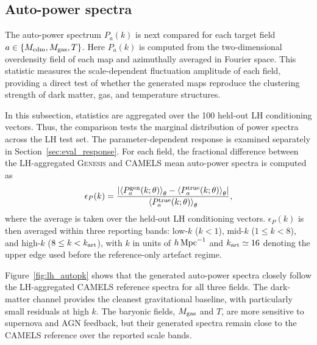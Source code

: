 \documentclass[usenatbib]{mnras}
\newcommand{\Mcdm}{M_{\rm cdm}}
\newcommand{\Mgas}{M_{\rm gas}}
\newcommand{\Tgas}{T}
\begin{document}
\subsection{Auto-power spectra}
\label{sec:eval_autopower}

The auto-power spectrum $P_a(k)$ is next compared for each target field
$a\in\{\Mcdm,\Mgas,\Tgas\}$. Here $P_a(k)$ is computed from the
two-dimensional overdensity field of each map and azimuthally averaged
in Fourier space. This statistic measures the scale-dependent
fluctuation amplitude of each field, providing a direct test of whether
the generated maps reproduce the clustering strength of dark matter,
gas, and temperature structures.

In this subsection, statistics are aggregated over the 100 held-out LH
conditioning vectors. Thus, the comparison tests the marginal distribution of
power spectra across the LH test set. The parameter-dependent response is examined
separately in Section~\ref{sec:eval_response}. For each field, the
fractional difference between the LH-aggregated
\textsc{Genesis} and CAMELS mean auto-power spectra is computed as
\begin{equation}
  \epsilon_P(k)
  =
  \frac{
  \left|
  \left\langle P_a^{\rm gen}(k;\theta)\right\rangle_{\theta}
  -
  \left\langle P_a^{\rm true}(k;\theta)\right\rangle_{\theta}
  \right|
  }{
  \left\langle P_a^{\rm true}(k;\theta)\right\rangle_{\theta}
  },
  \label{eq:lh_auto_eps}
\end{equation}
where the average is taken over the held-out LH conditioning vectors.
$\epsilon_P(k)$ is then averaged within three reporting bands:
low-$k$ ($k<1$), mid-$k$ ($1\leq k<8$), and high-$k$
($8\leq k<k_{\rm art}$), with $k$ in units of
$h\,{\rm Mpc}^{-1}$ and $k_{\rm art}\simeq 16$ denoting the upper
edge used before the reference-only artefact regime.

Figure~\ref{fig:lh_autopk} shows that the generated auto-power spectra
closely follow the LH-aggregated CAMELS reference spectra for all
three fields. The
dark-matter channel provides the cleanest gravitational baseline, with
particularly small residuals at high $k$. The baryonic fields,
$\Mgas$ and $\Tgas$, are more sensitive to supernova and AGN feedback,
but their generated spectra remain close to the CAMELS reference over
the reported scale bands.


\end{document}
